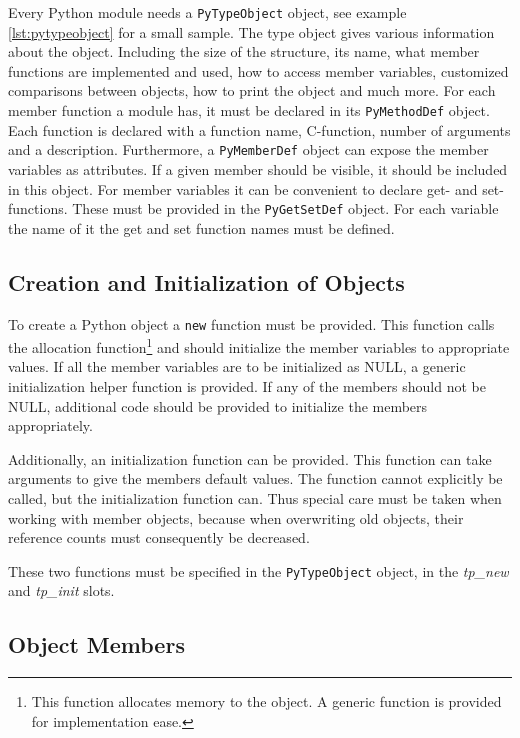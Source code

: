 Every Python module needs a \texttt{PyTypeObject} object, see example
\ref{lst:pytypeobject} for a small sample. The type object gives
various information about the object. Including the size of the
structure, its name, what member functions are implemented and used,
how to access member variables, customized comparisons between
objects, how to print the object and much more. For each member
function a module has, it must be declared in its
\texttt{PyMethodDef} object. Each function is declared with a
function name, C-function, number of arguments and a
description. Furthermore, a \texttt{PyMemberDef} object can expose the
member variables as attributes. If a given member should be visible,
it should be included in this object. For member variables it can be
convenient to declare get- and set-functions. These must be provided
in the \texttt{PyGetSetDef} object. For each variable the name of it
the get and set function names must be defined.


\subsection{Creation and Initialization of Objects}

To create a Python object a \texttt{new} function must be
provided. This function calls the allocation function\footnote{This
function allocates memory to the object. A generic function is
provided for implementation ease.} and should initialize the member
variables to appropriate values. If all the member variables are to be
initialized as NULL, a generic initialization helper function is
provided. If any of the members should not be NULL, additional code
should be provided to initialize the members appropriately.

Additionally, an initialization function can be provided. This
function can take arguments to give the members default values. The
 function cannot explicitly be called, but the initialization
function can. Thus special care must be taken when working with member
objects, because when overwriting old objects, their reference counts
must consequently be decreased.

These two functions must be specified in the \texttt{PyTypeObject}
object, in the \textit{tp\_new} and \textit{tp\_init} slots.

\subsection{Object Members}


